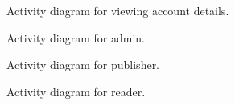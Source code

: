 \begin{figure}[H]
\begin{center}	

	\caption{Activity diagram for viewing account details.}
	\label{dia_actvt_vwaccntdtls}

\end{center}
\end{figure}



































\begin{figure}[H]
\begin{center}	

	\caption{Activity diagram for admin.}
	\label{dia_actvt_fradmn}

\end{center}
\end{figure}

\begin{figure}[H]
\begin{center}	

	\caption{Activity diagram for publisher.}
	\label{dia_actvt_frpblshr}

\end{center}
\end{figure}

\begin{figure}[H]
\begin{center}	

	\caption{Activity diagram for reader.}
	\label{dia_actvt_frrdr}

\end{center}
\end{figure}
